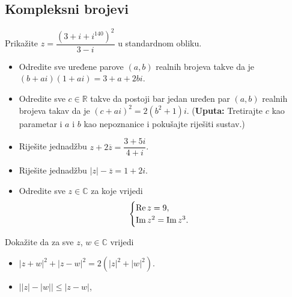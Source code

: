 \subsection*{Kompleksni brojevi}
\begin{exercise}{\unskip}
Prikažite \(z=\dfrac{(3+i+i^{140})^2}{3-i}\) u standardnom obliku.
\end{exercise}
\begin{exercise}{\unskip} \textbf{}
\begin{itemize}
\item[a)] Odredite sve uređene parove $(a, b)$ realnih brojeva takve da je $(b+ai)(1+ai)=3+a+2bi$.
\item[b)] Odredite sve $c\in \mathbb{R}$ takve da postoji bar jedan uređen par $(a, b)$ realnih brojeva takav da je $(c+ai)^2=2(b^2+1)i$. (\textbf{Uputa:} Tretirajte $c$ kao parametar i $a$ i $b$ kao nepoznanice i pokušajte riješiti sustav.)
\end{itemize}
\end{exercise}
\begin{exercise}{\unskip} \textbf{}
\begin{itemize}
\item[a)] Riješite jednadžbu \(z+2\overline{z}=\dfrac{3+5i}{4+i}\).
\item[b)] Riješite jednadžbu \(|z|-\overline{z}=1+2i\).
\item[c)] Odredite sve \(z\in \mathbb{C}\) za koje vrijedi
\[\begin{cases}
\operatorname{Re}{z}=9, \\
\operatorname{Im}{z^2}=\operatorname{Im}{z^3}.
   \end{cases}\]
\end{itemize}
\end{exercise}
\begin{exercise}{\unskip}
Dokažite da za sve \(z\), \(w\in \mathbb{C}\) vrijedi
\begin{itemize}
\item[a)] \(\left\lvert z+w\right\rvert^2+\left\lvert z-w\right\rvert^2=2\left(\left\lvert z\right\rvert^2+\left\lvert w\right\rvert^2\right)\).
\item[b)] \(\left\lvert \left\lvert z\right\rvert-\left\lvert w\right\rvert\right\rvert\leq \left\lvert z-w\right\rvert\),
\end{itemize}
\end{exercise}
